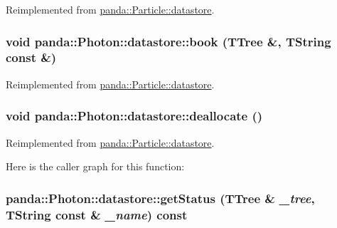 Reimplemented from \hyperlink{structpanda_1_1Particle_1_1datastore_aab4009a97b5f3cc30eaf61cd7dbf2e3d}{panda::Particle::datastore}.\hypertarget{structpanda_1_1Photon_1_1datastore_aecd0493c1cce6f3cbcb0e0d797f83719}{
\subsubsection[{book}]{\setlength{\rightskip}{0pt plus 5cm}void panda::Photon::datastore::book (TTree \&, \/  TString const \&)}}
\label{structpanda_1_1Photon_1_1datastore_aecd0493c1cce6f3cbcb0e0d797f83719}


Reimplemented from \hyperlink{structpanda_1_1Particle_1_1datastore_af75a5d8b8a18ee09ce98ab37888b4404}{panda::Particle::datastore}.\hypertarget{structpanda_1_1Photon_1_1datastore_a255374780b23e06a1fd24235847c77de}{
\subsubsection[{deallocate}]{\setlength{\rightskip}{0pt plus 5cm}void panda::Photon::datastore::deallocate ()}}
\label{structpanda_1_1Photon_1_1datastore_a255374780b23e06a1fd24235847c77de}


Reimplemented from \hyperlink{structpanda_1_1Particle_1_1datastore_ad741e5ab6ebeb9ca897ba9472d0dea36}{panda::Particle::datastore}.

Here is the caller graph for this function:\hypertarget{structpanda_1_1Photon_1_1datastore_a3a0f1b3be1d8cfa4bb5d6a5a6a48997d}{
\subsubsection[{getStatus}]{ panda::Photon::datastore::getStatus (TTree \& {\em \_\-tree}, \/  TString const \& {\em \_\-name}) const}}
\label{structpanda_1_1Photon_1_1datastore_a3a0f1b3be1d8cfa4bb5d6a5a6a48997d}


